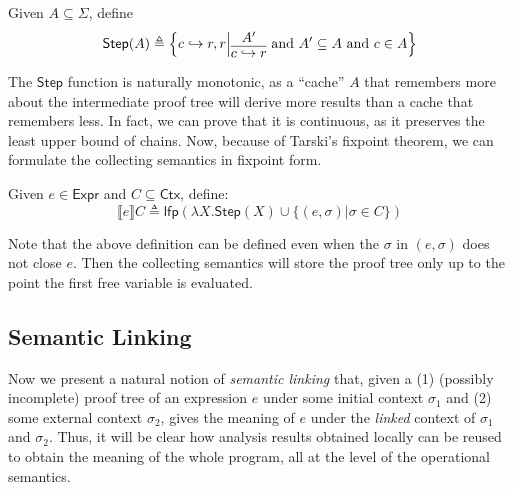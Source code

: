 \documentclass[acmsmall,screen,review]{acmart}\settopmatter{printfolios=true,printccs=false,printacmref=false}
\newcommand*{\Expr}{\mathsf{Expr}}
\newcommand*{\ctx}{\sigma}
\newcommand*{\Ctx}{\mathsf{Ctx}}
\newcommand*{\config}{c}
\newcommand*{\rightst}{r}
\newcommand*{\lfp}{\mathsf{lfp}}
\newcommand*{\semarrow}{\hookrightarrow}
\newcommand*{\sembracket}[1]{\lBrack{#1}\rBrack}
\begin{document}
\begin{definition}
  Given $A\subseteq\Sigma$, define
  \[
    \mathsf{Step}(A)\triangleq
    \left\{\config\semarrow\rightst, \rightst\middle|
    \begin{prooftree}[center=true]
      \hypo{A'}\infer1{\config\semarrow\rightst}
    \end{prooftree}\text{ and }
    A'\subseteq A\text{ and }\config\in A
    \right\}
  \]
\end{definition}

The $\mathsf{Step}$ function is naturally monotonic, as a ``cache'' $A$ that remembers more about the intermediate proof tree will derive more results than a cache that remembers less.
In fact, we can prove that it is continuous, as it preserves the least upper bound of chains.
Now, because of Tarski's fixpoint theorem, we can formulate the collecting semantics in fixpoint form.
\begin{definition}
  Given $e\in\Expr$ and $C\subseteq\Ctx$, define:
  \[
    \sembracket{e}C\triangleq\lfp(\lambda X.\mathsf{Step}(X)\cup\{(e,\ctx)|\ctx\in C\})
  \]
\end{definition}
Note that the above definition can be defined even when the $\ctx$ in $(e,\ctx)$ does not close $e$.
Then the collecting semantics will store the proof tree only up to the point the first free variable is evaluated.

\subsection{Semantic Linking}
Now we present a natural notion of \emph{semantic linking} that, given a (1) (possibly incomplete) proof tree of an expression $e$ under some initial context $\ctx_1$ and (2) some external context $\ctx_2$, gives the meaning of $e$ under the \emph{linked} context of $\ctx_1$ and $\ctx_2$.
Thus, it will be clear how analysis results obtained locally can be reused to obtain the meaning of the whole program, all at the level of the operational semantics.
\end{document}
